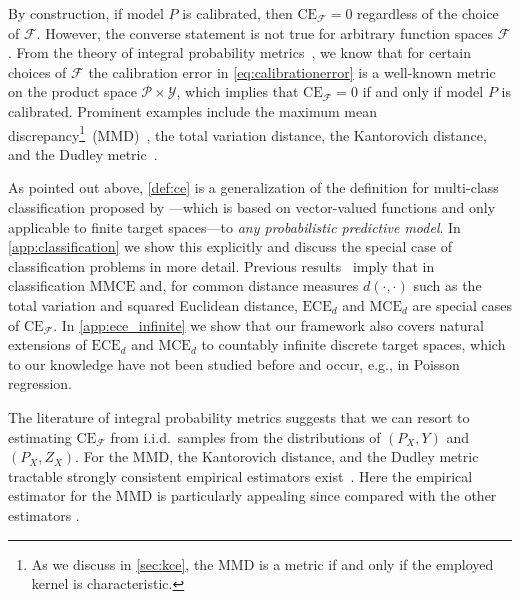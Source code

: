 \documentclass{article}
\begin{document}
By construction, if model $P$ is calibrated, then $\mathrm{CE}_{\mathcal{F}} = 0$
regardless of the choice of $\mathcal{F}$. However, the converse statement is not true
for arbitrary function spaces $\mathcal{F}$. From the theory of integral
probability metrics~\citep[see, e.g.,][]{Mueller1997,Sriperumbudur2009,Sriperumbudur2012},
we know that for certain choices of $\mathcal{F}$ the calibration error in
\cref{eq:calibrationerror} is a well-known metric on the product space
$\mathcal{P} \times \mathcal{Y}$, which implies that $\mathrm{CE}_\mathcal{F} = 0$
if and only if model $P$ is calibrated. Prominent examples include the maximum mean
discrepancy\footnote{As we discuss in \cref{sec:kce}, the MMD is a metric if and only if
the employed kernel is characteristic.}~(MMD)~\citep{Gretton2007},
the total variation distance, the Kantorovich distance,
and the Dudley metric~\citep[p.~310]{Dudley1989}.

As pointed out above, \cref{def:ce} is a generalization of the definition
for multi-class classification proposed by \citet{Widmann2019}---which is based on vector-valued functions and only applicable to finite
target spaces---to \emph{any probabilistic predictive model}.
In \cref{app:classification} we show this explicitly and discuss
the special case of classification problems in more detail. Previous results~\citep{Widmann2019}
imply that in classification $\mathrm{MMCE}$ and, for common distance measures
$d(\cdot, \cdot)$ such as the total variation and squared Euclidean distance,
$\mathrm{ECE}_d$ and $\mathrm{MCE}_d$ are special cases of $\mathrm{CE}_{\mathcal{F}}$.
In \cref{app:ece_infinite} we show that our framework also covers
natural extensions of $\mathrm{ECE}_d$ and $\mathrm{MCE}_d$ to countably
infinite discrete target spaces, which to our knowledge have not been studied
before and occur, e.g., in Poisson regression.

The literature of integral
probability metrics suggests that we can resort to estimating
$\mathrm{CE}_{\mathcal{F}}$ from i.i.d.\ samples from the distributions
of $(P_X, Y)$ and $(P_X, Z_X)$. For the MMD, the Kantorovich distance, and
the Dudley metric tractable strongly consistent empirical estimators
exist~\citep{Sriperumbudur2012}. Here the empirical
estimator for the MMD is particularly appealing since compared with the
other estimators .
\end{document}
